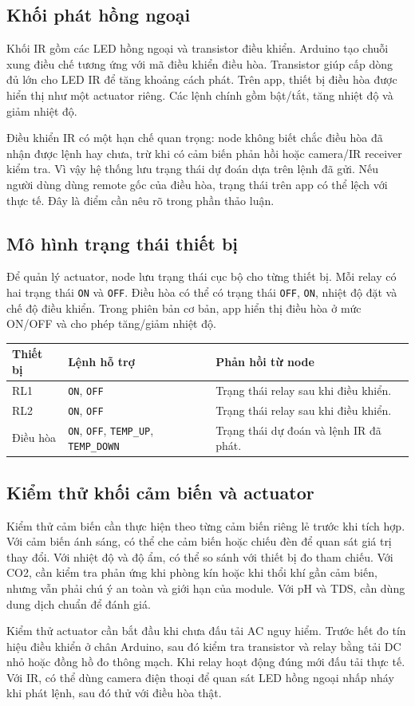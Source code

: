 \subsection{Khối phát hồng ngoại}
Khối IR gồm các LED hồng ngoại và transistor điều khiển. Arduino tạo chuỗi xung điều chế tương ứng với mã điều khiển điều hòa. Transistor giúp cấp dòng đủ lớn cho LED IR để tăng khoảng cách phát. Trên app, thiết bị điều hòa được hiển thị như một actuator riêng. Các lệnh chính gồm bật/tắt, tăng nhiệt độ và giảm nhiệt độ.

Điều khiển IR có một hạn chế quan trọng: node không biết chắc điều hòa đã nhận được lệnh hay chưa, trừ khi có cảm biến phản hồi hoặc camera/IR receiver kiểm tra. Vì vậy hệ thống lưu trạng thái dự đoán dựa trên lệnh đã gửi. Nếu người dùng dùng remote gốc của điều hòa, trạng thái trên app có thể lệch với thực tế. Đây là điểm cần nêu rõ trong phần thảo luận.

\subsection{Mô hình trạng thái thiết bị}
Để quản lý actuator, node lưu trạng thái cục bộ cho từng thiết bị. Mỗi relay có hai trạng thái \texttt{ON} và \texttt{OFF}. Điều hòa có thể có trạng thái \texttt{OFF}, \texttt{ON}, nhiệt độ đặt và chế độ điều khiển. Trong phiên bản cơ bản, app hiển thị điều hòa ở mức ON/OFF và cho phép tăng/giảm nhiệt độ.

\begin{longtable}{|p{3cm}|p{4cm}|p{6cm}|}
\hline
\textbf{Thiết bị} & \textbf{Lệnh hỗ trợ} & \textbf{Phản hồi từ node} \\
\hline
RL1 & \texttt{ON}, \texttt{OFF} & Trạng thái relay sau khi điều khiển. \\
\hline
RL2 & \texttt{ON}, \texttt{OFF} & Trạng thái relay sau khi điều khiển. \\
\hline
Điều hòa & \texttt{ON}, \texttt{OFF}, \texttt{TEMP\_UP}, \texttt{TEMP\_DOWN} & Trạng thái dự đoán và lệnh IR đã phát. \\
\hline
\end{longtable}

\subsection{Kiểm thử khối cảm biến và actuator}
Kiểm thử cảm biến cần thực hiện theo từng cảm biến riêng lẻ trước khi tích hợp. Với cảm biến ánh sáng, có thể che cảm biến hoặc chiếu đèn để quan sát giá trị thay đổi. Với nhiệt độ và độ ẩm, có thể so sánh với thiết bị đo tham chiếu. Với CO2, cần kiểm tra phản ứng khi phòng kín hoặc khi thổi khí gần cảm biến, nhưng vẫn phải chú ý an toàn và giới hạn của module. Với pH và TDS, cần dùng dung dịch chuẩn để đánh giá.

Kiểm thử actuator cần bắt đầu khi chưa đấu tải AC nguy hiểm. Trước hết đo tín hiệu điều khiển ở chân Arduino, sau đó kiểm tra transistor và relay bằng tải DC nhỏ hoặc đồng hồ đo thông mạch. Khi relay hoạt động đúng mới đấu tải thực tế. Với IR, có thể dùng camera điện thoại để quan sát LED hồng ngoại nhấp nháy khi phát lệnh, sau đó thử với điều hòa thật.
